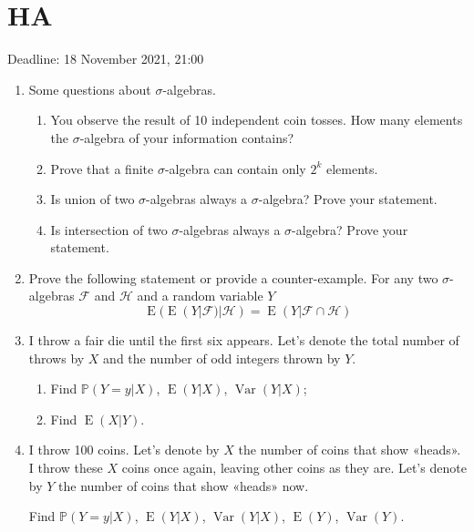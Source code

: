 \documentclass[12pt]{article}
\DeclareMathOperator{\Var}{Var}
\DeclareMathOperator{\E}{E}
\def \P{\mathbb{P}}
\begin{document}
\section{HA}


Deadline: 18 November 2021, 21:00

\begin{enumerate}

\item Some questions about $\sigma$-algebras. 
\begin{enumerate}
  \item You observe the result of 10 independent coin tosses. How many elements the $\sigma$-algebra of your information contains?
  \item Prove that a finite $\sigma$-algebra can contain only $2^k$ elements.
  \item Is union of two $\sigma$-algebras always a $\sigma$-algebra? Prove your statement.
  \item Is intersection of two $\sigma$-algebras always a $\sigma$-algebra? Prove your statement.
\end{enumerate}

\item Prove the following statement or provide a counter-example.
For any two $\sigma$-algebras $\mathcal{F}$ and $\mathcal{H}$ and a random variable $Y$
\[
  \E(\E(Y|\mathcal F)|\mathcal H) = \E(Y|\mathcal F \cap \mathcal H)
\]

\item I throw a fair die until the first six appears. 
Let's denote the total number of throws by $X$ and the number of odd integers thrown by $Y$.

\begin{enumerate}
  \item Find $\P(Y=y|X)$, $\E(Y|X)$, $\Var(Y|X)$;
  \item Find $\E(X|Y)$.
\end{enumerate}

\item I throw 100 coins. Let's denote by $X$ the number of coins that show «heads».
I throw these $X$ coins once again, leaving other coins as they are. 
Let's denote by $Y$ the number of coins that show «heads» now.

Find $\P(Y=y|X)$, $\E(Y|X)$, $\Var(Y|X)$, $\E(Y)$, $\Var(Y)$.




\end{enumerate}
\end{document}
